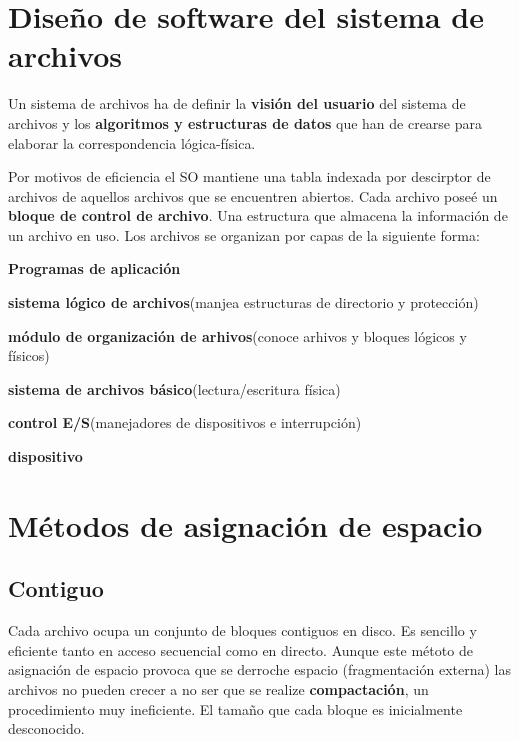 \section*{Diseño de software del sistema de archivos}

Un sistema de archivos ha de definir la \textbf{visión del usuario} del sistema de archivos y los \textbf{algoritmos y estructuras de datos} que han de crearse para elaborar la correspondencia lógica-física.

Por motivos de eficiencia el SO mantiene una tabla indexada por descirptor de archivos de aquellos archivos que se encuentren abiertos. Cada archivo poseé un \textbf{bloque de control de archivo}. Una estructura que almacena la información de un archivo en uso. Los archivos se organizan por capas de la siguiente forma:

\begin{centring}
	\textbf{Programas de aplicación}

	\downarrow

	\textbf{sistema lógico de archivos}(manjea estructuras de directorio y protección)

	\downarrow

	\textbf{módulo de organización de arhivos}(conoce arhivos y bloques lógicos y físicos)

	\downarrow

	\textbf{sistema de archivos básico}(lectura/escritura física)

	\downarrrow

	\textbf{control E/S}(manejadores de dispositivos e interrupción)

	\downarrow

	\textbf{dispositivo}
\end{centring}

\section*{Métodos de asignación de espacio}

\subsection*{Contiguo}
Cada archivo ocupa un conjunto de bloques contiguos en disco. Es sencillo y eficiente tanto en acceso secuencial como en directo. Aunque este métoto de asignación de espacio provoca que se derroche espacio (fragmentación externa) las archivos no pueden crecer a no ser que se realize \textbf{compactación}, un procedimiento muy ineficiente. El tamaño que cada bloque es inicialmente desconocido.

